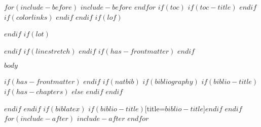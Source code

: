 \documentclass[
$if(fontsize)$
  $fontsize$,
$endif$
$if(papersize)$
  $papersize$paper,
$endif$
$for(classoption)$
  $classoption$$sep$,
$endfor$
]{MRM}
\begin{document}
$for(include-before)$
$include-before$
$endfor$
$if(toc)$
$if(toc-title)$
\renewcommand*\contentsname{$toc-title$}
$endif$
{
$if(colorlinks)$
\hypersetup{linkcolor=$if(toccolor)$$toccolor$$else$$endif$}
$endif$
\setcounter{tocdepth}{$toc-depth$}
\tableofcontents
}
$endif$
$if(lof)$
\listoffigures
$endif$
$if(lot)$
\listoftables
$endif$
$if(linestretch)$
$endif$
$if(has-frontmatter)$
\mainmatter
$endif$

$body$

$if(has-frontmatter)$
\backmatter
$endif$
$if(natbib)$
$if(bibliography)$
$if(biblio-title)$
$if(has-chapters)$
\renewcommand\bibname{$biblio-title$}
$else$
\renewcommand\refname{$biblio-title$}
$endif$
$endif$

$endif$
$endif$
$if(biblatex)$
\printbibliography$if(biblio-title)$[title=$biblio-title$]$endif$
$endif$
$for(include-after)$
$include-after$
$endfor$
\end{document}
